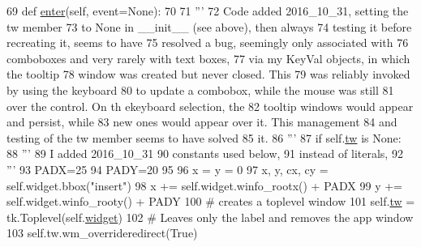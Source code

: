 \begin{DoxyCode}
69     \textcolor{keyword}{def }\hyperlink{classnegui_1_1createtooltip_1_1CreateToolTip_ab37624e73833e8ba485d10410c5986bb}{enter}(self, event=None):
70 
71         \textcolor{stringliteral}{'''}
72 \textcolor{stringliteral}{        Code added 2016\_10\_31, setting the tw member }
73 \textcolor{stringliteral}{        to None in \_\_init\_\_ (see above), then always }
74 \textcolor{stringliteral}{        testing it before recreating it, seems to have}
75 \textcolor{stringliteral}{        resolved a bug, seemingly only associated with}
76 \textcolor{stringliteral}{        comboboxes and very rarely with text boxes,}
77 \textcolor{stringliteral}{        via my KeyVal objects, in which the tooltip}
78 \textcolor{stringliteral}{        window was created but never closed.  This}
79 \textcolor{stringliteral}{        was reliably invoked by using the keyboard}
80 \textcolor{stringliteral}{        to update a combobox, while the mouse was still}
81 \textcolor{stringliteral}{        over the control. On th ekeyboard selection, the}
82 \textcolor{stringliteral}{        tooltip windows would appear and persist, while}
83 \textcolor{stringliteral}{        new ones would appear over it.  This management}
84 \textcolor{stringliteral}{        and testing of the tw member seems to have solved}
85 \textcolor{stringliteral}{        it.}
86 \textcolor{stringliteral}{        '''}
87         \textcolor{keywordflow}{if} self.\hyperlink{classnegui_1_1createtooltip_1_1CreateToolTip_ac47a0f82a5a354f6c8914c4631d1a0cf}{tw} \textcolor{keywordflow}{is} \textcolor{keywordtype}{None}:
88             \textcolor{stringliteral}{'''}
89 \textcolor{stringliteral}{            I added 2016\_10\_31}
90 \textcolor{stringliteral}{            constants used below,}
91 \textcolor{stringliteral}{            instead of literals,}
92 \textcolor{stringliteral}{            '''} 
93             PADX=25
94             PADY=20
95 
96             x = y = 0
97             x, y, cx, cy = self.widget.bbox(\textcolor{stringliteral}{"insert"})
98             x += self.widget.winfo\_rootx() + PADX
99             y += self.widget.winfo\_rooty() + PADY
100             \textcolor{comment}{# creates a toplevel window}
101             self.\hyperlink{classnegui_1_1createtooltip_1_1CreateToolTip_ac47a0f82a5a354f6c8914c4631d1a0cf}{tw} = tk.Toplevel(self.\hyperlink{classnegui_1_1createtooltip_1_1CreateToolTip_a6619448e568b135261fd02a6d9b36725}{widget})
102             \textcolor{comment}{# Leaves only the label and removes the app window}
103             self.tw.wm\_overrideredirect(\textcolor{keyword}{True})

\end{DoxyCode}
